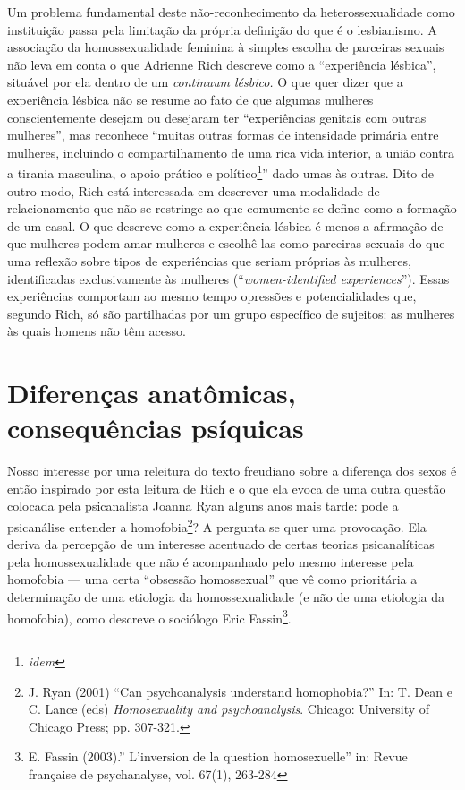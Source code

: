 Um problema fundamental deste não-reconhecimento da heterossexualidade
como instituição passa pela limitação da própria definição do que é o
lesbianismo. A associação da homossexualidade feminina à simples escolha
de parceiras sexuais não leva em conta o que Adrienne Rich descreve como
a ``experiência lésbica'', situável por ela dentro de um \emph{continuum
lésbico.} O que quer dizer que a experiência lésbica não se resume ao
fato de que algumas mulheres conscientemente desejam ou desejaram ter
``experiências genitais com outras mulheres'', mas reconhece ``muitas
outras formas de intensidade primária entre mulheres, incluindo o
compartilhamento de uma rica vida interior, a união contra a tirania
masculina, o apoio prático e político\footnote{\emph{idem}}'' dado umas
às outras. Dito de outro modo, Rich está interessada em descrever uma
modalidade de relacionamento que não se restringe ao que comumente se
define como a formação de um casal. O que descreve como a experiência
lésbica é menos a afirmação de que mulheres podem amar mulheres e
escolhê-las como parceiras sexuais do que uma reflexão sobre tipos de
experiências que seriam próprias às mulheres, identificadas
exclusivamente às mulheres (``\emph{women-identified experiences}'').
Essas experiências comportam ao mesmo tempo opressões e potencialidades
que, segundo Rich, só são partilhadas por um grupo específico de
sujeitos: as mulheres às quais homens não têm acesso.

\section{Diferenças anatômicas, consequências psíquicas}

Nosso interesse por uma releitura do texto freudiano sobre a diferença
dos sexos é então inspirado por esta leitura de Rich e o que ela evoca
de uma outra questão colocada pela psicanalista Joanna Ryan alguns anos
mais tarde: pode a psicanálise entender a homofobia\footnote{J. Ryan
  (2001) ``Can psychoanalysis understand homophobia?'' In: T. Dean e C.
  Lance (eds) \emph{Homosexuality and psychoanalysis}. Chicago:
  University of Chicago Press; pp. 307-321.}? A pergunta se quer uma
provocação. Ela deriva da percepção de um interesse acentuado de certas
teorias psicanalíticas pela homossexualidade que não é acompanhado pelo
mesmo interesse pela homofobia --- uma certa ``obsessão homossexual'' que
vê como prioritária a determinação de uma etiologia da homossexualidade
(e não de uma etiologia da homofobia), como descreve o sociólogo Eric
Fassin\footnote{E. Fassin (2003).'' L'inversion de la question
  homosexuelle'' in: Revue française de psychanalyse, vol. 67(1),
  263-284}.

